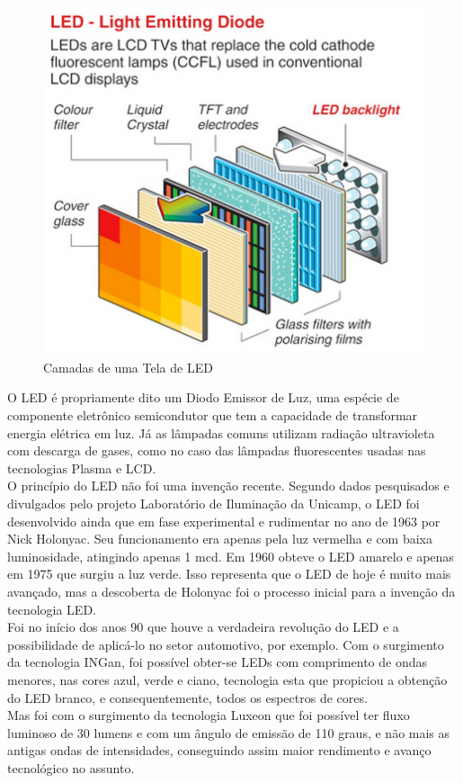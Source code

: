 \begin{figure}[!ht]
  \centering
  \includegraphics[width=.40\textwidth]{./figuras/camadas_led} 
  \caption{Camadas de uma Tela de LED}
  \label{fig:camadas_led} 
\end{figure}

O LED é propriamente dito um Diodo Emissor de Luz, uma espécie de componente eletrônico semicondutor que tem a capacidade de transformar energia elétrica em luz. Já as lâmpadas comuns utilizam radiação ultravioleta com descarga de gases, como no caso das lâmpadas fluorescentes usadas nas tecnologias Plasma e LCD. \\

O princípio do LED não foi uma invenção recente. Segundo dados pesquisados e divulgados pelo projeto Laboratório de Iluminação da Unicamp, o LED foi desenvolvido ainda que em fase experimental e rudimentar no ano de 1963 por Nick Holonyac. Seu funcionamento era apenas pela luz vermelha e com baixa luminosidade, atingindo apenas 1 mcd. Em 1960 obteve o LED amarelo e apenas em 1975 que surgiu a luz verde. Isso representa que o LED de hoje é muito mais avançado, mas a descoberta de Holonyac foi o processo inicial para a invenção da tecnologia LED.\\

Foi no início dos anos 90 que houve a verdadeira revolução do LED e a possibilidade de aplicá-lo no setor automotivo, por exemplo. Com o surgimento da tecnologia INGan, foi possível obter-se LEDs com comprimento de ondas menores, nas cores azul, verde e ciano, tecnologia esta que propiciou a obtenção do LED branco, e consequentemente, todos os espectros de cores.\\

Mas foi com o surgimento da tecnologia Luxeon que foi possível ter fluxo luminoso de 30 lumens e com um ângulo de emissão de 110 graus, e não mais as antigas ondas de intensidades, conseguindo assim maior rendimento e avanço tecnológico no assunto.\\

